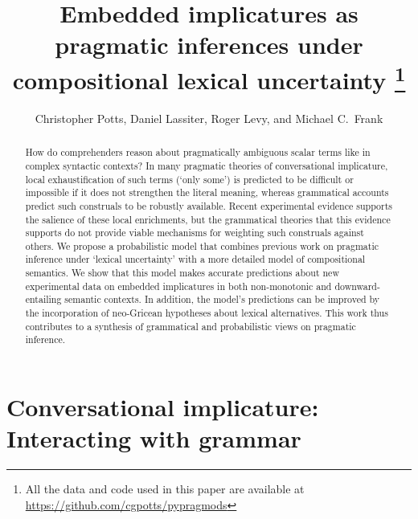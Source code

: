 \documentclass[leqno,12pt]{article}
\begin{document}
\renewcommand{\marginnote}[1]{}
\renewcommand{\todo}[1]{}
\renewcommand{\Rogersmarginnote}[1]{}


\title{Embedded implicatures as pragmatic inferences under compositional lexical uncertainty%
  \thanks{All the data and code used in this paper are available at \url{https://github.com/cgpotts/pypragmods}}}
\author{Christopher Potts, Daniel Lassiter, Roger Levy, and Michael C.~Frank}
\maketitle

\marginnote{Light revision to abstract in response to objections that it's not about what's possible but rather about what's marked.}

\begin{abstract} 
  How do comprehenders reason about pragmatically ambiguous scalar
  terms like  in complex syntactic contexts?  In many
  pragmatic theories of conversational implicature, local
  exhaustification of such terms (`only some') is predicted to be
  difficult or impossible if it does not strengthen the literal
  meaning, whereas grammatical accounts predict such construals to be
  robustly available. Recent experimental evidence supports the
  salience of these local enrichments, but the grammatical theories
  that this evidence supports do not provide viable mechanisms for
  weighting such construals against others. We propose a probabilistic
  model that combines previous work on pragmatic inference under
  `lexical uncertainty' with a more detailed model of compositional
  semantics. We show that this model makes accurate predictions about
  new experimental data on embedded implicatures in both non-monotonic
  and downward-entailing semantic contexts. In addition, the model's
  predictions can be improved by the incorporation of neo-Gricean
  hypotheses about lexical alternatives. This work thus contributes to
  a synthesis of grammatical and probabilistic views on pragmatic
  inference.
\end{abstract}


\section{Conversational implicature: Interacting with grammar}\label{sec:introduction}
\end{document}
